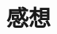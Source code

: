 \documentclass[autodetect-engine,dvi=dvipdfmx,ja=standard,
               a4j,11pt]{bxjsarticle}
\begin{document}
\section{感想}


\end{document}
